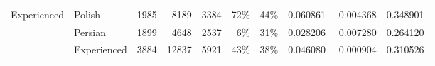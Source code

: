 \begin{table}
\begin{tabular}{llrrr|rrrrr}
\cline{1-10}
\multirow{3}{*}{Experienced} & Polish &                  1985 &                       8189 &                  3384 &                    72\% &                                                44\% &              0.060861 &                       -0.004368 &    0.348901 \\
            & Persian &                  1899 &                       4648 &                  2537 &                     6\% &                                                31\% &              0.028206 &                        0.007280 &    0.264120 \\
            & Experienced &                  3884 &                      12837 &                  5921 &                    43\% &                                                38\% &              0.046080 &                        0.000904 &    0.310526 \\
\bottomrule
\end{tabular}
\end{table}

